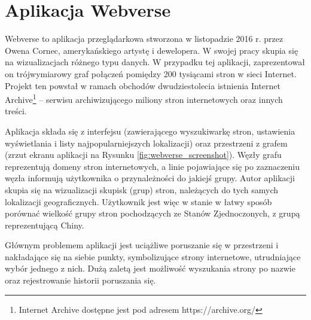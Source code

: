 \section{Aplikacja Webverse}

Webverse \cite{Webverse} to aplikacja przeglądarkowa stworzona w listopadzie 2016 r. przez Owena Cornec, amerykańskiego artystę i dewelopera. W swojej pracy skupia się na wizualizacjach różnego typu danych. W przypadku tej aplikacji, zaprezentował on trójwymiarowy graf połączeń pomiędzy 200 tysiącami stron w sieci Internet. Projekt ten powstał w ramach obchodów dwudziestolecia istnienia Internet Archive\footnote{Internet Archive dostępne jest pod adresem https://archive.org/} – serwisu archiwizującego miliony stron internetowych oraz innych treści.

Aplikacja składa się z interfejsu (zawierającego wyszukiwarkę stron, ustawienia wyświetlania i listy najpopularniejszych lokalizacji) oraz przestrzeni z grafem (zrzut ekranu aplikacji na Rysunku \ref{fig:webverse_screenshot}). Węzły grafu reprezentują domeny stron internetowych, a linie pojawiające się po zaznaczeniu węzła informują użytkownika o przynależności do jakiejś grupy. Autor aplikacji skupia się na wizualizacji skupisk (grup) stron, należących do tych samych lokalizacji geograficznych. Użytkownik jest więc w stanie w łatwy sposób porównać wielkość grupy stron pochodzących ze Stanów Zjednoczonych, z grupą reprezentującą Chiny.

Głównym problemem aplikacji jest uciążliwe poruszanie się w przestrzeni i nakładające się na siebie punkty, symbolizujące strony internetowe, utrudniające wybór jednego z nich. Dużą zaletą jest możliwość wyszukania strony po nazwie oraz rejestrowanie historii poruszania się.

